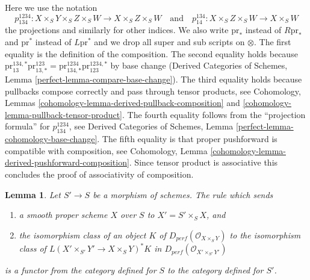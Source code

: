 \documentclass{stacks-project}
\theoremstyle{plain}
\newtheorem{lemma}[subsection]{Lemma}
\theoremstyle{definition}
\theoremstyle{remark}
\numberwithin{equation}{subsection}
\begin{document}
Here we use the notation
$$
p^{1234}_{134} : X \times_S Y \times_S Z \times_S W
\to X \times_S Z \times_S W
\quad\text{and}\quad
p^{134}_{14} : X \times_S Z \times_S W \to X \times_S W
$$
the projections and similarly for other indices.
We also write $\text{pr}_*$ instead of $R\text{pr}_*$ and
$\text{pr}^*$ instead of $L\text{pr}^*$ and we drop
all super and sub scripts on $\otimes$.
The first equality is the definition of the composition.
The second equality holds because
$\text{pr}^{134, *}_{13} \text{pr}^{123}_{13, *} =
\text{pr}^{1234}_{134, *} \text{pr}^{1234, *}_{123}$
by base change (Derived Categories of Schemes, Lemma
\ref{perfect-lemma-compare-base-change}).
The third equality holds because pullbacks compose
correctly and pass through tensor products, see
Cohomology, Lemmas \ref{cohomology-lemma-derived-pullback-composition} and
\ref{cohomology-lemma-pullback-tensor-product}.
The fourth equality follows from the ``projection formula'' for
$p^{1234}_{134}$, see Derived Categories of Schemes, Lemma
\ref{perfect-lemma-cohomology-base-change}.
The fifth equality is that proper pushforward is compatible
with composition, see
Cohomology, Lemma \ref{cohomology-lemma-derived-pushforward-composition}.
Since tensor product is associative
this concludes the proof of associativity of composition.

\begin{lemma}
\label{lemma-base-change-is-functor}
Let $S' \to S$ be a morphism of schemes.
The rule which sends
\begin{enumerate}
\item a smooth proper scheme $X$ over $S$ to $X' =  S' \times_S X$, and
\item the isomorphism class of an object $K$
of $D_{perf}(\mathcal{O}_{X \times_S Y})$ to the isomorphism class of
$L(X' \times_{S'} Y' \to X \times_S Y)^*K$
in $D_{perf}(\mathcal{O}_{X' \times_{S'} Y'})$
\end{enumerate}
is a functor from the category defined for $S$ to the category
defined for $S'$.
\end{lemma}
\end{document}
